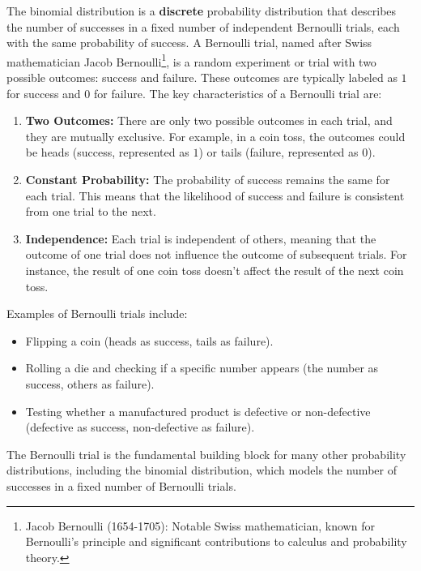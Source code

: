 \documentclass[
  a4paper,
]{scrbook}
\providecommand{\tightlist}{%
  \setlength{\itemsep}{0pt}\setlength{\parskip}{0pt}}\usepackage{longtable,booktabs,array}
\begin{document}
The binomial distribution is a \textbf{discrete} probability
distribution that describes the number of successes in a fixed number of
independent Bernoulli trials, each with the same probability of success.
A Bernoulli trial, named after Swiss mathematician Jacob
Bernoulli\footnote{Jacob Bernoulli (1654-1705): Notable Swiss
  mathematician, known for Bernoulli's principle and significant
  contributions to calculus and probability theory.}, is a random
experiment or trial with two possible outcomes: success and failure.
These outcomes are typically labeled as \(1\) for success and \(0\) for
failure. The key characteristics of a Bernoulli trial are:

\begin{enumerate}
\def\labelenumi{\arabic{enumi}.}
\item
  \textbf{Two Outcomes:} There are only two possible outcomes in each
  trial, and they are mutually exclusive. For example, in a coin toss,
  the outcomes could be heads (success, represented as \(1\)) or tails
  (failure, represented as \(0\)).
\item
  \textbf{Constant Probability:} The probability of success remains the
  same for each trial. This means that the likelihood of success and
  failure is consistent from one trial to the next.
\item
  \textbf{Independence:} Each trial is independent of others, meaning
  that the outcome of one trial does not influence the outcome of
  subsequent trials. For instance, the result of one coin toss doesn't
  affect the result of the next coin toss.
\end{enumerate}

Examples of Bernoulli trials include:

\begin{itemize}
\tightlist
\item
  Flipping a coin (heads as success, tails as failure).
\item
  Rolling a die and checking if a specific number appears (the number as
  success, others as failure).
\item
  Testing whether a manufactured product is defective or non-defective
  (defective as success, non-defective as failure).
\end{itemize}

The Bernoulli trial is the fundamental building block for many other
probability distributions, including the binomial distribution, which
models the number of successes in a fixed number of Bernoulli trials.
\end{document}
